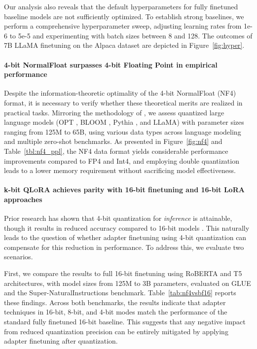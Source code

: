 Our analysis also reveals that the default hyperparameters for fully finetuned baseline models are not sufficiently optimized. To establish strong baselines, we perform a comprehensive hyperparameter sweep, adjusting learning rates from 1e-6 to 5e-5 and experimenting with batch sizes between 8 and 128. The outcomes of 7B LLaMA finetuning on the Alpaca dataset are depicted in Figure~\ref{fig:hyper}.

\paragraph{4-bit NormalFloat surpasses 4-bit Floating Point in empirical performance}

Despite the information-theoretic optimality of the 4-bit NormalFloat (NF4) format, it is necessary to verify whether these theoretical merits are realized in practical tasks. Mirroring the methodology of \citet{dettmers2022case}, we assess quantized large language models (OPT \citep{zhang2022opt}, BLOOM \cite{scao2022bloom}, Pythia \cite{biderman2023pythia}, and LLaMA) with parameter sizes ranging from 125M to 65B, using various data types across language modeling and multiple zero-shot benchmarks. As presented in Figure~\ref{fig:nf4} and Table~\ref{tbl:nf4_ppl}, the NF4 data format yields considerable performance improvements compared to FP4 and Int4, and employing double quantization leads to a lower memory requirement without sacrificing model effectiveness.

\paragraph{k-bit \textsc{QLoRA} achieves parity with 16-bit finetuning and 16-bit LoRA approaches}

Prior research has shown that 4-bit quantization for \emph{inference} is attainable, though it results in reduced accuracy compared to 16-bit models \citep{dettmers2022case,frantar2022gptq}. This naturally leads to the question of whether adapter finetuning using 4-bit quantization can compensate for this reduction in performance. To address this, we evaluate two scenarios.

First, we compare the results to full 16-bit finetuning using RoBERTA and T5 architectures, with model sizes from 125M to 3B parameters, evaluated on GLUE and the Super-NaturalInstructions benchmark. Table~\ref{tab:nf4vsbf16} reports these findings. Across both benchmarks, the results indicate that adapter techniques in 16-bit, 8-bit, and 4-bit modes match the performance of the standard fully finetuned 16-bit baseline. This suggests that any negative impact from reduced quantization precision can be entirely mitigated by applying adapter finetuning after quantization.

